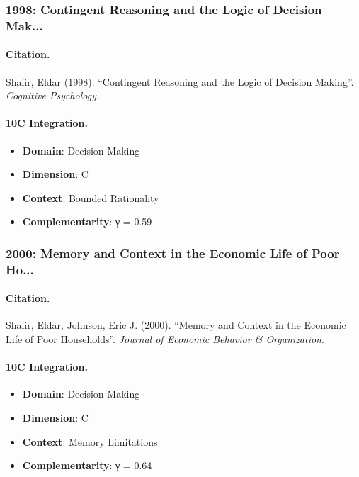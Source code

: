 \subsubsection{1998: Contingent Reasoning and the Logic of Decision Mak...}

\paragraph{Citation.}
Shafir, Eldar (1998). ``Contingent Reasoning and the Logic of Decision Making''. \textit{Cognitive Psychology}.

\paragraph{10C Integration.}
\begin{itemize}[nosep]
  \item \textbf{Domain}: Decision Making
  \item \textbf{Dimension}: C
  \item \textbf{Context}: Bounded Rationality
  \item \textbf{Complementarity}: γ = 0.59
\end{itemize}


\subsubsection{2000: Memory and Context in the Economic Life of Poor Ho...}

\paragraph{Citation.}
Shafir, Eldar, Johnson, Eric J. (2000). ``Memory and Context in the Economic Life of Poor Households''. \textit{Journal of Economic Behavior & Organization}.

\paragraph{10C Integration.}
\begin{itemize}[nosep]
  \item \textbf{Domain}: Decision Making
  \item \textbf{Dimension}: C
  \item \textbf{Context}: Memory Limitations
  \item \textbf{Complementarity}: γ = 0.64
\end{itemize}


